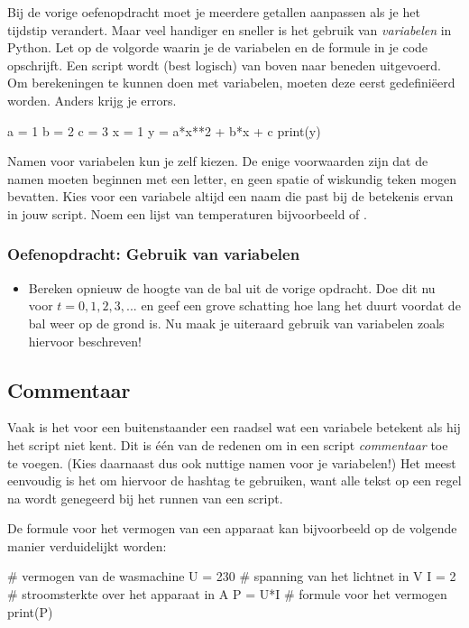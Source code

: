 \documentclass[a4paper,11pt, fleqn]{article}
\begin{document}
Bij de vorige oefenopdracht moet je meerdere getallen aanpassen als je het tijdstip verandert. Maar veel handiger en sneller is het gebruik van {\it variabelen} in Python. Let op de volgorde waarin je de variabelen en de formule in je code opschrijft. Een script wordt (best logisch) van boven naar beneden uitgevoerd. Om berekeningen te kunnen doen met variabelen, moeten deze eerst gedefini\"eerd worden. Anders krijg je errors.

\begin{python}
a = 1
b = 2
c = 3
x = 1
y = a*x**2 + b*x + c
print(y)
\end{python}

Namen voor variabelen kun je zelf kiezen. De enige voorwaarden zijn dat de namen moeten beginnen met een letter, en geen spatie of wiskundig teken mogen bevatten. Kies voor een variabele altijd een naam die past bij de betekenis ervan in jouw script. Noem een lijst van temperaturen bijvoorbeeld  of .

\subsubsection*{Oefenopdracht: Gebruik van variabelen} 
\begin{itemize}
	\item Bereken opnieuw de hoogte van de bal uit de vorige opdracht. Doe dit nu voor $t = 0,1,2,3, ... $ en geef een grove schatting hoe lang het duurt voordat de bal weer op de grond is. Nu maak je uiteraard gebruik van variabelen zoals hiervoor beschreven!
\end{itemize}

\subsection{Commentaar}
Vaak is het voor een buitenstaander een raadsel wat een variabele betekent als hij het script niet kent. 
Dit is \'e\'en van de redenen om in een script \textit{commentaar} toe te voegen. (Kies daarnaast dus ook nuttige namen voor je variabelen!)
Het meest eenvoudig is het om hiervoor de hashtag te gebruiken, want alle tekst op een regel na \pythoninline{#} wordt genegeerd bij het runnen van een script. 

De formule voor het vermogen van een apparaat kan bijvoorbeeld op de volgende manier verduidelijkt worden:
\begin{python}
# vermogen van de wasmachine
U = 230	   # spanning van het lichtnet in V
I = 2      # stroomsterkte over het apparaat in A
P = U*I    # formule voor het vermogen
print(P)
\end{python}
\end{document}
